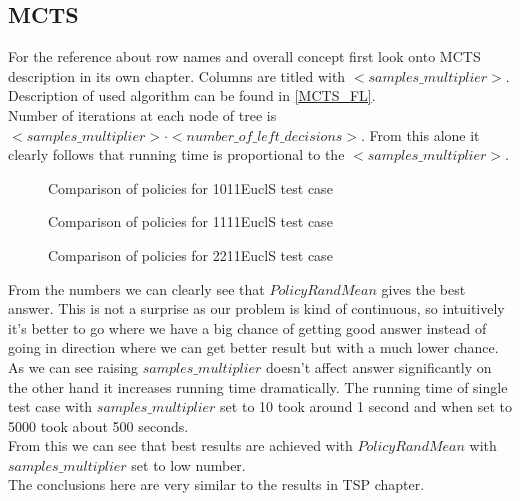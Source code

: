 \FloatBarrier


\FloatBarrier

\begin{figure}[ht]
  
\end{figure}

\subsection{MCTS}

For the reference about row names and overall concept first look onto MCTS description in its own chapter.
Columns are titled with $<samples\_multiplier>$. \\
Description of used algorithm can be found in \ref{MCTS_FL}. \\
Number of iterations at each node of tree is $<samples\_multiplier> \cdot <number\_of\_left\_decisions>$.
From this alone it clearly follows that running time is proportional to the $<samples\_multiplier>$.

\FloatBarrier
\begin{figure}[ht]
  
  \caption{Comparison of policies for 1011EuclS test case}
\end{figure}

\begin{figure}[ht]
  
  \caption{Comparison of policies for 1111EuclS test case}
\end{figure}

\begin{figure}[ht]
  
  \caption{Comparison of policies for 2211EuclS test case}
\end{figure}
\FloatBarrier

From the numbers we can clearly see that $PolicyRandMean$ gives the best answer.
This is not a surprise as our problem is kind of continuous, so intuitively it's better
to go where we have a big chance of getting good answer instead of going in direction
where we can get better result but with a much lower chance. \\
As we can see raising $samples\_multiplier$ doesn't affect answer significantly on the other hand
it increases running time dramatically. The running time of single test case with $samples\_multiplier$
set to 10 took around 1 second and when set to 5000 took about 500 seconds. \\
From this we can see that best results are achieved with $PolicyRandMean$ with $samples\_multiplier$ set to low number. \\
The conclusions here are very similar to the results in TSP chapter. 

